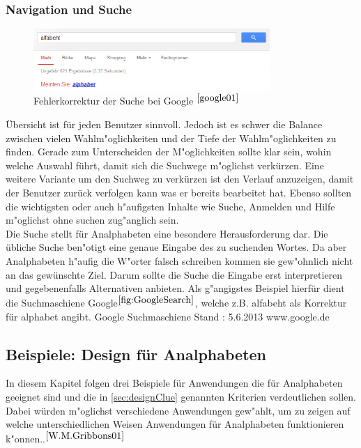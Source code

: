\subsubsection{Navigation und Suche}
\begin{figure}[h]
	\centering
		\includegraphics[width=0.80\textwidth]{Daten/rechtschreibung.png}
	\caption{Fehlerkorrektur der Suche bei Google $^{\ref{google01}}$}
	\label{fig:GoogleSearch}
\end{figure}

Übersicht ist für jeden Benutzer sinnvoll. Jedoch ist es schwer die Balance zwischen vielen Wahlm"oglichkeiten und der Tiefe der Wahlm"oglichkeiten zu finden. Gerade zum Unterscheiden der M"oglichkeiten sollte klar sein, wohin welche Auswahl führt, damit sich
 die Suchwege m"oglichst verkürzen. Eine weitere Variante um den Suchweg zu verkürzen ist den Verlauf anzuzeigen, damit der Benutzer zurück verfolgen kann was er bereits bearbeitet hat. Ebenso sollten die wichtigsten oder auch h"aufigsten Inhalte wie Suche, Anmelden und Hilfe m"oglichst ohne suchen zug"anglich sein.\\
Die Suche stellt für Analphabeten eine besondere Herausforderung dar. Die übliche Suche ben"otigt eine genaue Eingabe des zu suchenden Wortes. Da aber Analphabeten h"aufig die W"orter falsch schreiben kommen sie gew"ohnlich nicht an das gewünschte Ziel. Darum sollte die Suche die Eingabe erst interpretieren und gegebenenfalls Alternativen anbieten.
Als g"angigstes Beispiel hierfür dient die Suchmaschiene Google$^{\ref{fig:GoogleSearch}}$, welche z.B. \glqq alfabeht\grqq{}  als Korrektur für \glqq alphabet\grqq{}  angibt.
						{Google Suchmaschiene}
						{Stand : 5.6.2013}
						{www.google.de}

\subsection{Beispiele: Design für Analphabeten}
In diesem Kapitel folgen drei Beispiele für Anwendungen die für Analphabeten geeignet sind und die in \ref{sec:designClue} genannten Kriterien verdeutlichen sollen. Dabei würden m"oglichst verschiedene Anwendungen gew"ahlt, um zu zeigen auf welche unterschiedlichen Weisen Anwendungen für Analphabeten funktionieren k"onnen..$^{\ref{W.M.Gribbons01}}$\\


